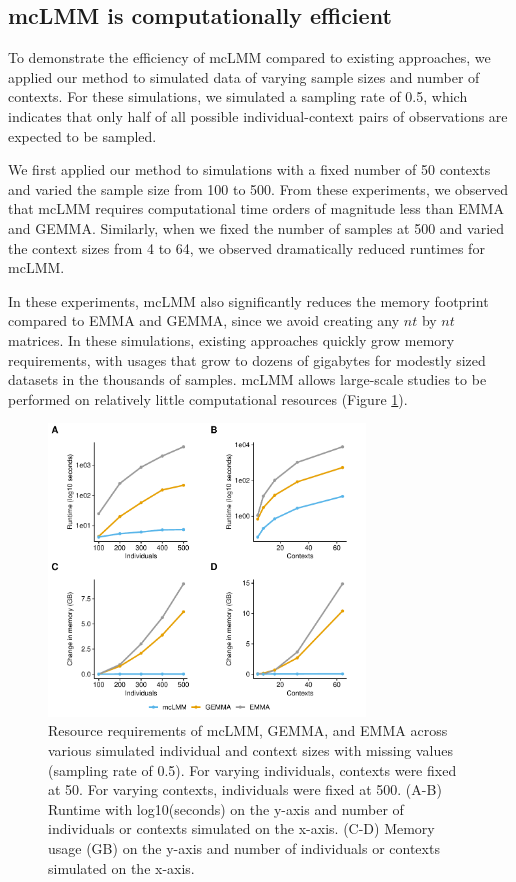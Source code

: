     \subsection{mcLMM is computationally efficient}
        To demonstrate the efficiency of mcLMM compared to existing approaches, we applied our method to simulated data of varying sample sizes and number of contexts. For these simulations, we simulated a sampling rate of 0.5, which indicates that only half of all possible individual-context pairs of observations are expected to be sampled. 
        
        We first applied our method to simulations with a fixed number of 50 contexts and varied the sample size from 100 to 500. From these experiments, we observed that mcLMM requires computational time orders of magnitude less than EMMA and GEMMA. Similarly, when we fixed the number of samples at 500 and varied the context sizes from 4 to 64, we observed dramatically reduced runtimes for mcLMM.
        
        In these experiments, mcLMM also significantly reduces the memory footprint compared to EMMA and GEMMA, since we avoid creating any $nt$ by $nt$ matrices. In these simulations, existing approaches quickly grow memory requirements, with usages that grow to dozens of gigabytes for modestly sized datasets in the thousands of samples. mcLMM allows large-scale studies to be performed on relatively little computational resources (Figure \ref{fig:fig1}). 
        
        \begin{figure}
            \centering
            \includegraphics[width=0.75\textwidth]{chapter3/figures/Figure_1.pdf}
            \caption{Resource requirements of mcLMM, GEMMA, and EMMA across various simulated individual and context sizes with missing values (sampling rate of 0.5). For varying individuals, contexts were fixed at 50. For varying contexts, individuals were fixed at 500. (A-B) Runtime with log10(seconds) on the y-axis and number of individuals or contexts simulated on the x-axis. (C-D) Memory usage (GB) on the y-axis and number of individuals or contexts simulated on the x-axis. }
            \label{fig:fig1}
        \end{figure}
        
